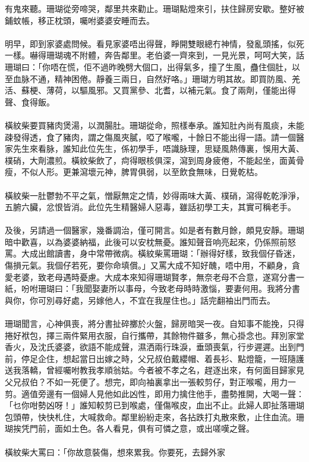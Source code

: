 \documentclass[a5paper, 10pt, openany]{book} %
\begin{document}
有鬼來聽。珊瑚從旁啼哭，鄰里共來勸止。珊瑚點燈來引，扶住歸房安歇。整好被鋪蚊帳，移正枕頭，囑咐婆婆安睡而去。\\\\	明早，即到家婆處問候。看見家婆唔出得聲，睜開雙眼總冇神情，發亂頭搖，似死一樣。嚇得珊瑚魂不附體，奔告鄰里。老伯婆一齊來到，一見光景，呵呵大笑，話珊瑚曰：「你唔在慌，佢不過昨晚劈大個口，出得氣多，撞了生風，蠱住個肚，以至血脉不通，精神困倦。靜養三兩日，自然好咯。」珊瑚方明其故。即買防風、羌活、蘇梗、薄荷，以驅風邪。又買黨參、北耆，以補元氣。食了兩劑，僅能出得聲、食得飯。\\\\	橫紋柴要買豬肉煲湯，以潤腸肚。珊瑚從命，照樣奉承。誰知肚內尚有風痰，未能疎發得透，食了豬肉，謂之傷風夾膩，啞了喉嚨，十餘日不能出得一語。請一個醫家先生來看脉，誰知此位先生，係初學手，唔識脉理，思疑風熱傳裏，悞用大黃、樸硝，大劑濃煎。橫紋柴飲了，疴得眼核俱深，瀉到周身疲倦，不能起坐，面黃骨瘦，不似人形。更兼瀉壞元神，脾胃俱弱，以至飲食無味，日覺乾枯。\\\\	橫紋柴一肚鬱勃不平之氣，憎厭無定之情，妙得兩味大黃、樸硝，瀉得乾乾淨淨，五腑六臟，忿恨皆消。此位先生精醫婦人惡毒，雖話初學工夫，其實可稱老手。\\\\	及後，另請過一個醫家，幾番調治，僅可開言。如是者有數月餘，頗見安靜。珊瑚暗中歡喜，以為婆婆納福，此後可以安枕無憂。誰知聲音响亮起來，仍係照前怒罵。大成出館讀書，身中常帶微病。橫紋柴罵珊瑚：「辦得好樣，致我個仔昏迷，傷損元氣。我個仔若死，要你命填償。」又罵大成不知好醜，唔中用，不顧身，貪愛老婆，致老母遇時憂慮。大成本來知得珊瑚賢孝，無奈老母不合意，遂寫分書一紙，吩咐珊瑚曰：「我聞娶妻所以事母，今致老母時時激惱，要妻何用。我將分書與你，你可別尋好處，另嫁他人，不宜在我屋住也。」話完翻袖出門而去。\\\\	珊瑚聞言，心神俱喪，將分書扯碎擲於火盤，歸房暗哭一夜。自知事不能挽，只得捲好袱包，擇三兩件緊用衣服，自行攜帶，其餘物件雖多，無心掛念也。拜別家堂香火，及沈氏婆婆，欲語不能成聲，濕洒兩行珠淚，垂頭喪氣，行步遲遲。出到門前，停足企住，想起當日出嫁之時，父兄叔伯戴纓帽、着長衫、點燈籠，一班隨護送我落轎，曾經囑咐教我孝順翁姑。今者被不孝之名，趕逐出來，有何面目歸家見父兄叔伯？不如一死便了。想完，即向袖裏拿出一張較剪仔，對正喉嚨，用力一剪。適值旁邊有一個婦人見他如此凶性，即用力擒住他手，盡勢推開，大喝一聲：「乜你咁勢凶呀！」誰知較剪已到喉處，僅傷喉皮，血出不止。此婦人即扯落珊瑚包頭帶，快快札住，大喊救命。鄰里紛紛走來，各拈跌打丸散來敷，止住血流。珊瑚挨凭門前，面如土色。各人看見，俱有可憐之意，或出嗟嘆之聲。\\\\	橫紋柴大罵曰：「你故意裝傷，想來累我。你要死，去歸外家
\end{document}
